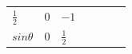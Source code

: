 {\begin{tabular}[t]{|l|l|l|l|l|l|l|}
                \begin{math}\frac{1}{2}\end{math}
               &
    
    
        0 &
    
    
        
                \begin{math}-1\end{math}
     \tabularnewline\cline{1-1}\cline{2-2}\cline{3-3}\cline{4-4}\cline{5-5}\cline{6-6}\cline{7-7}
    
    
        
                \begin{math}sin\theta \end{math}
               &
    
    
        0 &
    
    
        
                \begin{math}\frac{1}{2}\end{math}
               &
    
    
        

\end{tabular}}
